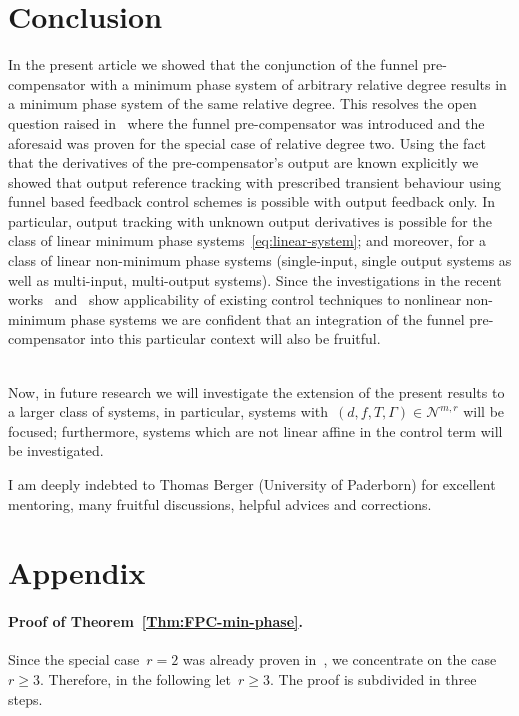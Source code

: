 \documentclass[ envcountsect, envcountsame]{svjour3}
\newcommand{\cN}{\mathcal{N}}
\begin{document}
\section{Conclusion}
%
In the present article we showed that the conjunction of the funnel pre-compensator with a minimum phase system of arbitrary relative degree results in a minimum phase system of the same relative degree. This resolves the open question raised in~\cite{BergReis18b} where the funnel pre-compensator was introduced and the aforesaid was proven for the special case of relative degree two.
Using the fact that the derivatives of the pre-compensator's output are known explicitly we showed that output reference tracking with prescribed transient behaviour using funnel based feedback control schemes is possible with output feedback only.
In particular, output tracking with unknown output derivatives is possible for the class of linear minimum phase systems~\eqref{eq:linear-system}; and moreover, for a class of linear non-minimum phase systems (single-input, single output systems as well as multi-input, multi-output systems).
Since the investigations in the recent works~\cite{BergLanz20} and~\cite{BergDrue21} show applicability of existing control techniques to nonlinear non-minimum phase systems we are confident that an integration of the funnel pre-compensator into this particular context will also be fruitful.

\ \\
Now, in future research we will investigate the extension of the present results to a larger class of systems, in particular, systems with~$(d,f,T,\Gamma) \in \cN^{m,r}$  will be focused; furthermore, systems which are not linear affine in the control term will be investigated.


\begin{acknowledgements}
I am deeply indebted to Thomas Berger (University of Paderborn) for excellent mentoring, many fruitful discussions, helpful advices and corrections.
\end{acknowledgements}

\section*{Appendix}
\paragraph{Proof of Theorem~\ref{Thm:FPC-min-phase}.}
Since the special case~$r=2$ was already proven in~\cite[Thm.~2]{BergReis18b}, we concentrate on the case~$r \ge 3$. 
Therefore, in the following let~$r \ge 3$.
%
The proof is subdivided in three steps.
\end{document}
